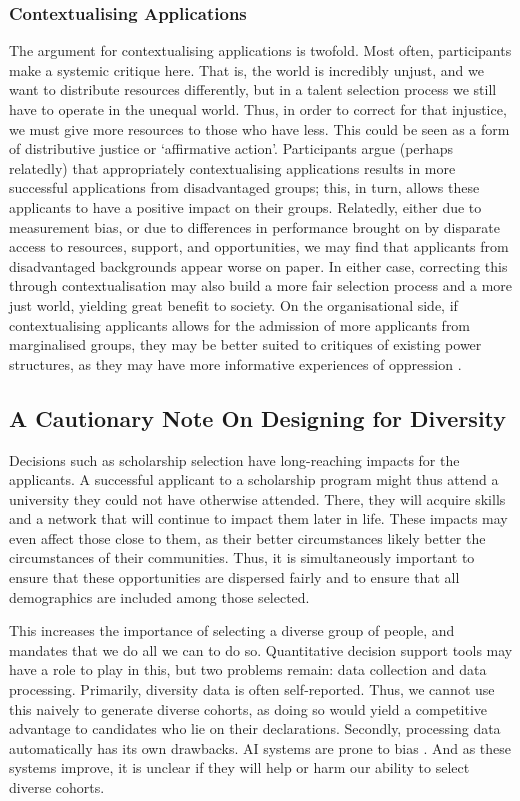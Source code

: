 \subsubsection{Contextualising Applications}
The argument for contextualising applications is twofold. Most often, participants make a systemic critique here. That is, the world is incredibly unjust, and we want to distribute resources differently, but in a talent selection process we still have to operate in the unequal world. Thus, in order to correct for that injustice, we must give more resources to those who have less. This could be seen as a form of distributive justice or `affirmative action'. Participants argue (perhaps relatedly) that appropriately contextualising applications results in more successful applications from disadvantaged groups; this, in turn, allows these applicants to have a positive impact on their groups. Relatedly, either due to measurement bias, or due to differences in performance brought on by disparate access to resources, support, and opportunities, we may find that applicants from disadvantaged backgrounds appear worse on paper. In either case, correcting this through contextualisation may also build a more fair selection process and a more just world, yielding great benefit to society. On the organisational side, if contextualising applicants allows for the admission of more applicants from marginalised groups, they may be better suited to critiques of existing power structures, as they may have more informative experiences of oppression \cite{mills2015blackness}.

\subsection{A Cautionary Note On Designing for Diversity}
Decisions such as scholarship selection have long-reaching impacts for the applicants. A successful applicant to a scholarship program might thus attend a university they could not have otherwise attended. There, they will acquire skills and a network that will continue to impact them later in life. These impacts may even affect those close to them, as their better circumstances likely better the circumstances of their communities. Thus, it is simultaneously important to ensure that these opportunities are dispersed fairly and to ensure that all demographics are included among those selected.

This increases the importance of selecting a diverse group of people, and mandates that we do all we can to do so. Quantitative decision support tools may have a role to play in this, but two problems remain: data collection and data processing. Primarily, diversity data is often self-reported. Thus, we cannot use this naively to generate diverse cohorts, as doing so would yield a competitive advantage to candidates who lie on their declarations. Secondly, processing data automatically has its own drawbacks. AI systems are prone to bias \cite{friedler_impossibility_2016}. And as these systems improve, it is unclear if they will help or harm our ability to select diverse cohorts.

